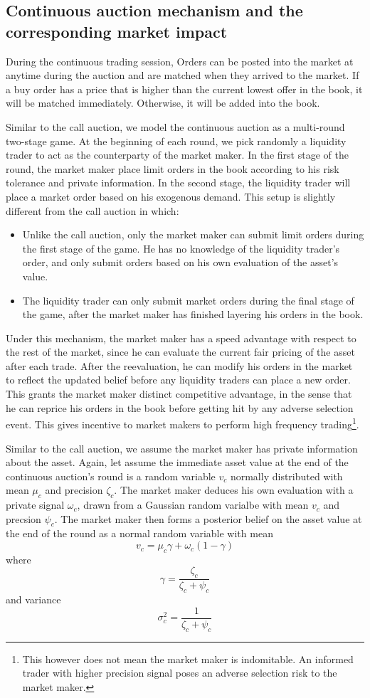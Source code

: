 \documentclass{article}
\begin{document}
\subsection{Continuous auction mechanism and the corresponding market impact}\label{subSecTheoreticalFrameworkContinuousAuction}
During the continuous trading session, Orders can be posted into the market at anytime during the auction and are matched when they arrived to the market. If a buy order has a price that is higher than the current lowest offer in the book, it will be matched immediately. Otherwise, it will be added into the book.

Similar to the call auction, we model the continuous auction as a multi-round two-stage game. At the beginning of each round, we pick randomly a liquidity trader to act as the counterparty of the market maker. In the first stage of the round, the market maker place limit orders in the book according to his risk tolerance and private information. In the second stage, the liquidity trader will place a market order based on his exogenous demand. This setup is slightly different from the call auction in which:
\begin{itemize}
  \item Unlike the call auction, only the market maker can submit limit orders during the first stage of the game. He has no knowledge of the liquidity trader's order, and only submit orders based on his own evaluation of the asset's value.
  \item The liquidity trader can only submit market orders during the final stage of the game, after the market maker has finished layering his orders in the book.
\end{itemize}
Under this mechanism, the market maker has a speed advantage with respect to the rest of the market, since he can evaluate the current fair pricing of the asset after each trade. After the reevaluation, he can modify his orders in the market to reflect the updated belief before any liquidity traders can place a new order. This grants the market maker distinct competitive advantage, in the sense that he can reprice his orders in the book before getting hit by any adverse selection event. This gives incentive to market makers to perform high frequency trading\footnote{This however does not mean the market maker is indomitable. An informed trader with higher precision signal poses an adverse selection risk to the market maker.}.

Similar to the call auction, we assume the market maker has private information about the asset. Again, let assume the immediate asset value at the end of the continuous auction's round is a random variable $v_c$ normally distributed with mean $\mu_c$ and precision $\zeta_c$. The market maker deduces his own evaluation with a private signal $\omega_c$, drawn from a Gaussian random varialbe with mean $v_c$ and precsion $\psi_c$. The market maker then forms a posterior belief on the asset value at the end of the round as a normal random variable with mean
\[
  v_c=\mu_c \gamma + \omega_c(1 - \gamma)
\]
where
\[
  \gamma = \frac{\zeta_c}{\zeta_c+\psi_c}
\]
and variance
\[
  \sigma_c^2=\frac{1}{\zeta_c+\psi_c}
\]
\end{document}
